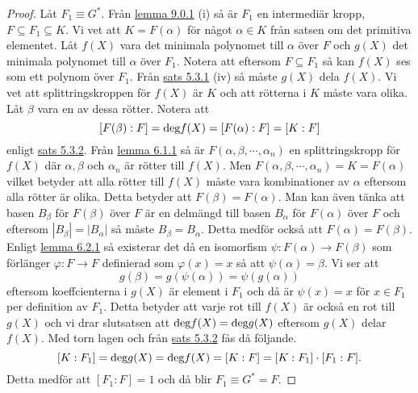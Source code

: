 \documentclass{article}
\newcommand{\grad}[0]{\textnormal{deg}}
\theoremstyle{definition}
\begin{document}
\begin{proof}
  Låt $F_1 \equiv G^*.$ Från \hyperlink{lemma9.0.1}{lemma 9.0.1} (i) så är $F_1$ en intermediär kropp, $F \subseteq F_1 \subseteq K$.
  Vi vet att $K = F(\alpha)$ för något $\alpha \in K$ från satsen om det primitiva elementet. Låt $f(X)$ vara det minimala polynomet till $\alpha$ över $F$
  och $g(X)$ det minimala polynomet till $\alpha$ över $F_1$. Notera att eftersom $F \subseteq F_1$ så kan $f(X)$ ses som ett polynom över $F_1$. 
  Från \hyperlink{minpol}{sats 5.3.1} (iv) så måste $g(X)$ dela $f(X)$. Vi vet att splittringskroppen för $f(X)$ är $K$ och att rötterna i $K$ måste vara olika. 
  Låt $\beta$ vara en av dessa rötter. Notera att 
  \[ [F(\beta): F] = \grad f(X) = [F(\alpha):F] = [K:F] \]
  enligt \hyperlink{5.3.2}{sats 5.3.2}. Från \hyperlink{lemma6.0.1}{lemma 6.1.1} så är $F(\alpha, \beta, \cdots, \alpha_n)$
  en splittringskropp för $f(X)$ där $\alpha, \beta$ och $\alpha_n$ är rötter till $f(X)$. Men $F(\alpha, \beta, \cdots, \alpha_n) = K = F(\alpha)$
  vilket betyder att alla rötter till $f(X)$ måste vara kombinationer av $\alpha$ eftersom alla rötter är olika. Detta betyder att $F(\beta) = F(\alpha)$.
  Man kan även tänka att basen $B_\beta$ för $F(\beta)$ över $F$ är en delmängd till basen $B_\alpha$ för $F(\alpha)$ över $F$ och eftersom 
  $|B_\beta| = |B_\alpha|$ så måste $B_\beta = B_\alpha$. Detta medför också att $F(\alpha) = F(\beta)$.
  Enligt \hyperlink{6.0.2}{lemma 6.2.1} så 
  existerar det då en isomorfism $\psi: F(\alpha) \rightarrow F(\beta)$
  som förlänger $\varphi: F \rightarrow F$ definierad som $\varphi(x) = x$ så att $\psi(\alpha) = \beta.$
  Vi ser att 
  \[g(\beta) = g(\psi(\alpha)) = \psi(g(\alpha))\]
  eftersom koeffcienterna i $g(X)$ är element i $F_1$ och då är $\psi(x) = x$ för $x \in F_1$ per definition av $F_1.$ Detta betyder 
  att varje rot till $f(X)$ är också en rot till $g(X)$ och vi drar slutsatsen att $\grad f(X) = \grad g(X)$ eftersom $g(X)$ delar $f(X)$. 
  Med torn lagen och från \hyperlink{5.3.2}{sats 5.3.2} fås då följande.
  \[ [K:F_1] = \grad g(X) = \grad f(X) = [K:F] = [K:F_1] \cdot [F_1: F]. \]
  Detta medför att $[F_1:F] = 1$ och då blir $F_1 \equiv G^* = F.$
\end{proof}
\end{document}
